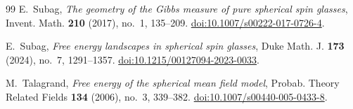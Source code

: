 \documentclass[11pt,reqno]{amsart}
\numberwithin{equation}{section}
\theoremstyle{plain}
\theoremstyle{definition}
\theoremstyle{remark}
\newcommand{\1}{\mathbf 1}
\begin{document}
\begin{thebibliography}{99}
E.~Subag,
\emph{The geometry of the Gibbs measure of pure spherical spin glasses},
Invent. Math. \textbf{210} (2017), no.~1, 135--209.
\href{https://doi.org/10.1007/s00222-017-0726-4}
{doi:10.1007/s00222-017-0726-4}.

E.~Subag,
\emph{Free energy landscapes in spherical spin glasses},
Duke Math. J. \textbf{173} (2024), no.~7, 1291--1357.
\href{https://doi.org/10.1215/00127094-2023-0033}
{doi:10.1215/00127094-2023-0033}.

M.~Talagrand,
\emph{Free energy of the spherical mean field model},
Probab. Theory Related Fields \textbf{134} (2006), no.~3, 339--382.
\href{https://doi.org/10.1007/s00440-005-0433-8}
{doi:10.1007/s00440-005-0433-8}.

\end{thebibliography}
\end{document}
